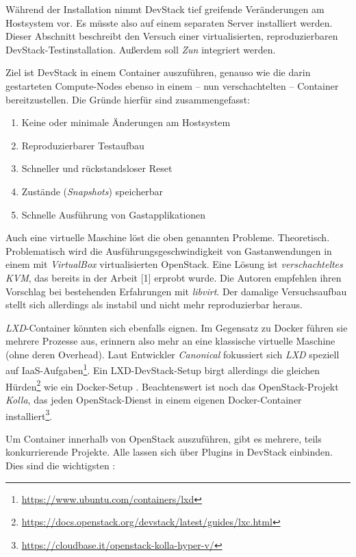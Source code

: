 Während der Installation nimmt DevStack tief greifende Veränderungen am Hostsystem vor. Es müsste also auf einem separaten Server installiert werden. Dieser Abschnitt beschreibt den Versuch einer virtualisierten, reproduzierbaren DevStack-Testinstallation. Außerdem soll \emph{Zun} integriert werden. 

Ziel ist DevStack in einem Container auszuführen, genauso wie die darin gestarteten Compute-Nodes ebenso in einem -- nun verschachtelten -- Container bereitzustellen. Die Gründe hierfür sind zusammengefasst:

\begin{enumerate}
	\item Keine oder minimale Änderungen am Hostsystem
	\item Reproduzierbarer Testaufbau
	\item Schneller und rückstandsloser Reset
	\item Zustände (\emph{Snapshots}) speicherbar
	\item Schnelle Ausführung von Gastapplikationen
\end{enumerate}

\noindent Auch eine virtuelle Maschine löst die oben genannten Probleme. Theoretisch. Problematisch wird die Ausführungsgeschwindigkeit von Gastanwendungen in einem mit \emph{VirtualBox} virtualisierten OpenStack. Eine Lösung ist \emph{verschachteltes KVM}, das bereits in der Arbeit [1] erprobt wurde. Die Autoren empfehlen ihren Vorschlag bei bestehenden Erfahrungen mit \emph{libvirt}. Der damalige Versuchsaufbau stellt sich allerdings als instabil und nicht mehr reproduzierbar heraus.


\emph{LXD}-Container könnten sich ebenfalls eignen. Im Gegensatz zu Docker führen sie mehrere Prozesse aus, erinnern also mehr an eine klassische virtuelle Maschine (ohne deren Overhead). Laut Entwickler \emph{Canonical} fokussiert sich \emph{LXD} speziell auf IaaS-Aufgaben\footnote{\url{https://www.ubuntu.com/containers/lxd}}. Ein LXD-DevStack-Setup birgt allerdings die gleichen Hürden\footnote{\url{https://docs.openstack.org/devstack/latest/guides/lxc.html}} wie ein Docker-Setup \cite{graber:2016:openstack-lxd}. Beachtenswert ist noch das OpenStack-Projekt \emph{Kolla}, das jeden OpenStack-Dienst in einem eigenen Docker-Container installiert\footnote{\url{https://cloudbase.it/openstack-kolla-hyper-v/}}.

Um Container innerhalb von OpenStack auszuführen, gibt es mehrere, teils konkurrierende Projekte. Alle lassen sich über Plugins in DevStack einbinden. Dies sind die wichtigsten \cite{singh:2017:containers-openstack}:

